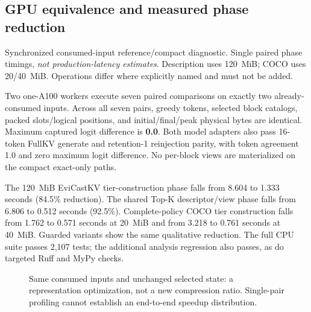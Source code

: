 \documentclass[10pt,letterpaper]{article}
\newcommand{\Evi}{EviCastKV}
\newcommand{\resulttable}[2]{\begin{center}\small\begin{adjustbox}{max width=#1}\end{adjustbox}\end{center}}
\begin{document}
\subsection{GPU equivalence and measured phase reduction}
\begin{table}[htbp]
\caption{Synchronized consumed-input reference/compact diagnostic.
Single paired phase timings, \emph{not production-latency estimates}.
Description uses 120~MiB; COCO uses 20/40~MiB. Operations differ where
explicitly named and must not be added.}
\label{tab:compact}
\resulttable{\linewidth}{compact}
\end{table}

Two one-A100 workers execute seven paired comparisons on exactly two
already-consumed inputs. Across all seven pairs, greedy tokens, selected
block catalogs, packed slots/logical positions, and initial/final/peak
physical bytes are identical. Maximum captured logit difference is
\textbf{0.0}. Both model adapters also pass 16-token FullKV generate and
retention-1 reinjection parity, with token agreement 1.0 and zero maximum
logit difference. No per-block views are materialized on the compact
exact-only paths.

The 120~MiB \Evi{} tier-construction phase falls from 8.604 to 1.333
seconds (84.5\% reduction). The shared Top-K descriptor/view phase falls
from 6.806 to 0.512 seconds (92.5\%). Complete-policy COCO tier construction
falls from 1.762 to 0.571 seconds at 20~MiB and from 3.218 to 0.761 seconds
at 40~MiB. Guarded variants show the same qualitative reduction.
The full CPU suite passes 2,107 tests; the additional analysis regression
also passes, as do targeted Ruff and MyPy checks.

\begin{figure}[htbp]
\centering
{}
\caption{Same consumed inputs and unchanged selected state: a representation
optimization, not a new compression ratio. Single-pair profiling cannot
establish an end-to-end speedup distribution.}
\label{fig:compact}
\end{figure}
\end{document}
